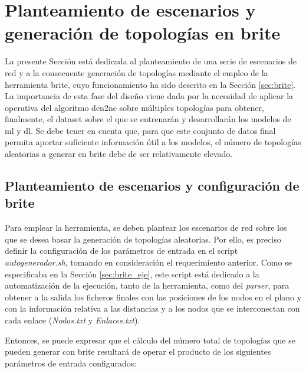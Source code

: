 \section{Planteamiento de escenarios y generación de topologías en \acrshort{brite}}
\label{sec:ejebrite}

La presente Sección está dedicada al planteamiento de una serie de escenarios de red y a la consecuente generación de topologías mediante el empleo de la herramienta \gls{brite}, cuyo funcionamiento ha sido descrito en la Sección \ref{sec:brite}. La importancia de esta fase del diseño viene dada por la necesidad de aplicar la operativa del algoritmo \gls{den2ne} sobre múltiples topologías para obtener, finalmente, el dataset sobre el que se entrenarán y desarrollarán los modelos de \gls{ml} y \gls{dl}. Se debe tener en cuenta que, para que este conjunto de datos final permita aportar suficiente información útil a los modelos, el número de topologías aleatorias a generar en \gls{brite} debe de ser relativamente elevado.

\vspace{3mm}

\subsection{Planteamiento de escenarios y configuración de \acrshort{brite}}
\label{sec:conftopo}

Para emplear la herramienta, se deben plantear los escenarios de red sobre los que se desea basar la generación de topologías aleatorias. Por ello, es preciso definir la configuración de los parámetros de entrada en el script \textit{autogenerador.sh}, tomando en consideración el requerimiento anterior. Como se especificaba en la Sección \ref{sec:brite_eje}, este script está dedicado a la automatización de la ejecución, tanto de la herramienta, como del \textit{parser}, para obtener a la salida los ficheros finales con las posiciones de los nodos en el plano y con la información relativa a las distancias y a los nodos que se interconectan con cada enlace (\textit{Nodos.txt} y \textit{Enlaces.txt}). 

\vspace{3mm}

Entonces, se puede expresar que el cálculo del número total de topologías que se pueden generar con \gls{brite} resultará de operar el producto de los siguientes parámetros de entrada configurados:

